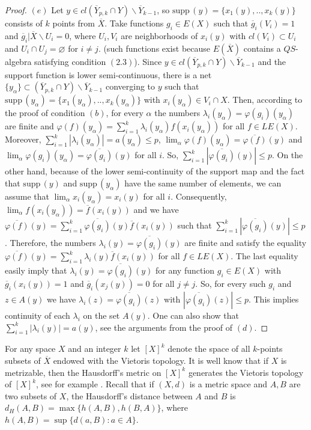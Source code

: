 \documentclass[12pt]{amsart}
\def\supp{{\mathrm {supp}}\,}
\begin{document}
\begin{proof}
$(e)$ Let $y\in cl(\overline Y_{p,k}\cap Y)\backslash\overline Y_{k-1}$, so $\supp(y)=\{x_1(y),..,x_k(y)\}$ consists of $k$ points from $\overline X$. 
Take functions $g_i\in E(X)$ such that $\overline g_i(V_i)=1$ and $\overline g_i|\overline X\backslash U_i=0$, where $U_i, V_i$ are neighborhoods of $x_i(y)$ with $cl(V_i)\subset U_i$ and $U_i\cap U_j=\varnothing$ for $i\neq j$. 
(such functions exist because $E(\overline X)$ contains a $QS$-algebra satisfying condition $(2.3)$). Since 
$y\in cl(\overline Y_{p,k}\cap Y)\backslash\overline Y_{k-1}$ and the support function is lower semi-continuous, there is a net $\{y_\alpha\}\subset (\overline Y_{p,k}\cap Y)\backslash\overline Y_{k-1}$ converging to $y$ such that $\supp(y_\alpha)=\{x_1(y_\alpha),..,x_k(y_\alpha)\}$ with $x_i(y_\alpha)\in V_i\cap X$. Then, according to the proof of condition $(b)$, for every $\alpha$ the numbers $\lambda_i(y_\alpha)=\varphi(g_i)(y_\alpha)$ are finite and $\varphi(f)(y_\alpha)=\sum_{i=1}^k\lambda_i(y_\alpha)f(x_i(y_\alpha))$ for all $f\in LE(X)$. Moreover, $\sum_{i=1}^k|\lambda_i(y_\alpha)|=a(y_\alpha)\leq p$, 
$\lim_\alpha\varphi(f)(y_\alpha)=\overline{\varphi(f)}(y)$ and $\lim_\alpha\varphi(g_i)(y_\alpha)=\overline{\varphi(g_i)}(y)$ for all $i$. 
So, $\sum_{i=1}^k|\overline{\varphi(g_i)}(y)|\leq p$.
On the other hand, because of the lower semi-continuity of the support map and the fact that $\supp(y)$ and $\supp(y_\alpha)$ have the same number of elements, we can assume that $\lim_\alpha x_i(y_\alpha)=x_i(y)$ for all $i$. Consequently, $\lim_\alpha f(x_i(y_\alpha))=\overline f(x_i(y))$ and
we have  $\overline{\varphi(f)}(y)=\sum_{i=1}^k\overline{\varphi(g_i)}(y)\overline f(x_i(y))$ such that $\sum_{i=1}^k|\overline{\varphi(g_i)}(y)|\leq p$. 
Therefore, the numbers $\lambda_i(y)=\overline{\varphi(g_i)}(y)$ are finite and satisfy the equality $\overline{\varphi(f)}(y)=\sum_{i=1}^k\lambda_i(y)\overline f(x_i(y))$ for all $f\in LE(X)$. The last equality easily imply that 
$\lambda_i(y)=\overline{\varphi(g_i)}(y)$ for any function $g_i\in E(X)$ with $\overline g_i(x_i(y))=1$ and $\overline g_i(x_j(y))=0$ for all $j\neq j$. 
So, for every such $g_i$ and $z\in A(y)$ we have $\lambda_i(z)=\overline{\varphi(g_i)}(z)$ with $|\overline{\varphi(g_i)}(z)|\leq p$. This implies continuity of each $\lambda_i$ on the set $A(y)$. One can also show that $\sum_{i=1}^k|\lambda_i(y)|=a(y)$, see the arguments from the proof of $(d)$.
\end{proof}
For any space $X$ and an integer $k$ let $[X]^k$ denote the space of all $k$-points subsets of $\overline X$ endowed with the Vietoris topology. It is well know that if $X$ is metrizable, then the Hausdorff's metric on $[X]^k$ generates the Vietoris topology of $[X]^k$, see for example \cite{mi}.  Recall that if $(X,d)$ is a metric space and $A,B$ are two subsets of $X$, the Hausdorff's distance between $A$ and $B$ is $d_H(A,B)=\max\{h(A,B), h(B,A)\}$, where $h(A,B)=\sup\{d(a,B):a\in A\}$.
\end{document}

